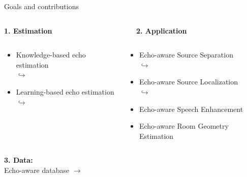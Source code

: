 \begin{frame}{Goals and contributions}
    \vfill
    \begin{columns}[T,onlytextwidth]
        \begin{column}{0.48\textwidth}
            \centering
            \textbf{1. Estimation}
        \end{column}
        \begin{column}{0.48\textwidth}
            \centering
            \textbf{2. Application}
        \end{column}
    \end{columns}
    \begin{columns}[T]
        \begin{column}{0.48\textwidth}
            \begin{itemize}
                \item Knowledge-based echo estimation
                \\$\hookrightarrow$ \blaster
                \item Learning-based echo estimation
                \\$\hookrightarrow$ \lantern
            \end{itemize}
        \end{column}
        \begin{column}{0.48\textwidth}
            \begin{itemize}
                \item Echo-aware Source Separation
                \\$\hookrightarrow$ \separake
                \item Echo-aware Source Localization
                \\$\hookrightarrow$ \mirage
                \item Echo-aware Speech Enhancement
                \item Echo-aware Room Geometry Estimation
            \end{itemize}
        \end{column}
    \end{columns}
    \begin{center}
        \textbf{3. Data:}
        \\Echo-aware database $\rightarrow$ \dechorate
    \end{center}
\end{frame}


